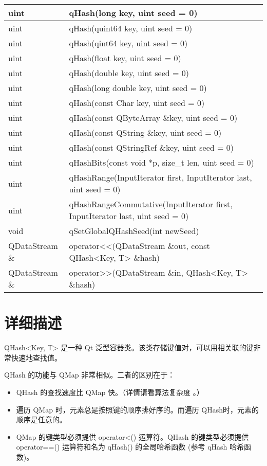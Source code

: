 \begin{longtable}{|l|l|}
\hline
uint& 	qHash(long key, uint seed = 0)\\
\hline
uint& 	qHash(quint64 key, uint seed = 0)\\
\hline
uint& 	qHash(qint64 key, uint seed = 0)\\
\hline
uint& 	qHash(float key, uint seed = 0)\\
\hline
uint& 	qHash(double key, uint seed = 0)\\
\hline
uint& 	qHash(long double key, uint seed = 0)\\
\hline
uint& 	qHash(const Char key, uint seed = 0)\\
\hline
uint& 	qHash(const QByteArray \&key, uint seed = 0)\\
\hline
uint& 	qHash(const QString \&key, uint seed = 0)\\
\hline
uint& 	qHash(const QStringRef \&key, uint seed = 0)\\
\hline
uint& 	qHashBits(const void *p, size\_t len, uint seed = 0)\\
\hline
uint& 	qHashRange(InputIterator first, InputIterator last, uint seed = 0)\\
\hline
uint& 	qHashRangeCommutative(InputIterator first, InputIterator last, uint seed = 0)\\
\hline
void& 	qSetGlobalQHashSeed(int newSeed)\\
\hline
QDataStream \& & 	operator<<(QDataStream \&out, const QHash<Key, T> \&hash)\\
\hline
QDataStream \& &	operator>>(QDataStream \&in, QHash<Key, T> \&hash)\\
\hline
\end{longtable}

\splitLine

\section{详细描述}\label{detail}

QHash<Key, T> 是一种 Qt 泛型容器类。该类存储键值对，可以用相关联的键非常快速地查找值。

QHash 的功能与 QMap 非常相似。二者的区别在于：

\begin{itemize}
\item QHash 的查找速度比 QMap 快。（详情请看算法复杂度 。）
\item 遍历 QMap 时，元素总是按照键的顺序排好序的。而遍历 QHash时，元素的顺序是任意的。
\item QMap 的键类型必须提供 operator<() 运算符。QHash 的键类型必须提供 operator==() 运算符和名为 qHash() 的全局哈希函数 (参考 qHash 哈希函数)。
\end{itemize}

